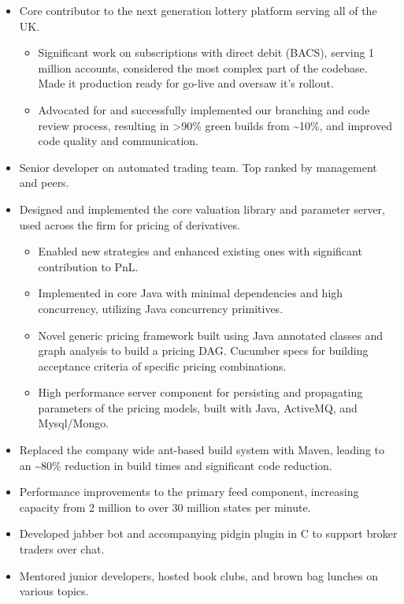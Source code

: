 \documentclass[11pt,a4paper,roman]{moderncv}
\begin{document}
\vspace{5mm}

\begin{itemize}
\item Core contributor to the next generation lottery platform serving all of the UK.
  \begin{itemize}
  \item Significant work on subscriptions with direct debit (BACS), serving 1 million accounts, considered the most complex part of the codebase. Made it production ready for go-live and oversaw it's rollout.
  \item Advocated for and successfully implemented our branching and code review process, resulting in >90\% green builds from \textasciitilde10\%, and improved code quality and communication.
  \end{itemize}
\end{itemize}

\vspace{5mm}

\clearpage
{}
\begin{itemize}
\item Senior developer on automated trading team. Top ranked by management and peers.
\item Designed and implemented the core valuation library and parameter server, used across the firm for pricing of derivatives.
  \begin{itemize}
  \item Enabled new strategies and enhanced existing ones with significant contribution to PnL.
  \item Implemented in core Java with minimal dependencies and high concurrency, utilizing Java concurrency primitives.
  \item Novel generic pricing framework built using Java annotated classes and graph analysis to build a pricing DAG. Cucumber specs for building acceptance criteria of specific pricing combinations.
  \item High performance server component for persisting and propagating parameters of the pricing models, built with Java, ActiveMQ, and Mysql/Mongo.
  \end{itemize}
\item Replaced the company wide ant-based build system with Maven, leading to an \textasciitilde80\% reduction in build times and significant code reduction.
\item Performance improvements to the primary feed component, increasing capacity from 2 million to over 30 million states per minute.
\item Developed jabber bot and accompanying pidgin plugin in C to support broker traders over chat.
\item Mentored junior developers, hosted book clubs, and brown bag lunches on various topics.
\end{itemize}
\end{document}
